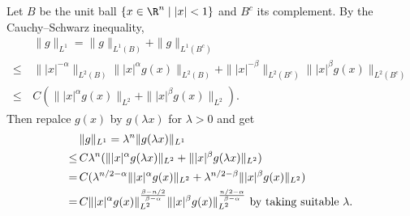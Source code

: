 \begin{itemize}
Let $B$ be the unit ball $\{x\in\R^n\mid|x|<1\}$ and $B^c$ its complement. 
By the Cauchy--Schwarz inequality,
\begin{align*}
    &\,\|g\|_{L^1}=\|g\|_{L^1(B)}+\|g\|_{L^1(B^c)}\\
    \leq&\,\||x|^{-\alpha}\|_{L^2(B)}\||x|^{\alpha}g(x)\|_{L^2(B)}+\||x|^{-\beta}\|_{L^2(B^c)}\||x|^{\beta}g(x)\|_{L^2(B^c)}\\
    \leq&\,C(\||x|^{\alpha}g(x)\|_{L^2}+\||x|^{\beta}g(x)\|_{L^2}).
\end{align*}
Then repalce $g(x)$ by $g(\lambda x)$ for $\lambda>0$ and get
\begin{align*}
    &\,\|g\|_{L^1}=\lambda^n\|g(\lambda x)\|_{L^1}\\
    \leq&\,C\lambda^n(\||x|^{\alpha}g(\lambda x)\|_{L^2}+\||x|^{\beta}g(\lambda x)\|_{L^2})\\
    =&\,C(\lambda^{n/2-\alpha}\||x|^{\alpha}g(x)\|_{L^2}+\lambda^{n/2-\beta}\||x|^{\beta}g(x)\|_{L^2})\\
    =&\,C\||x|^{\alpha}g(x)\|_{L^2}^{\frac{\beta-n/2}{\beta-\alpha}}\||x|^{\beta}g(x)\|_{L^2}^\frac{n/2-\alpha}{\beta-\alpha} {\ \rm by\ taking\ suitable\  \lambda}.
\end{align*}
\end{itemize}

